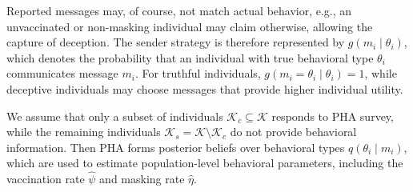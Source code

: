 \documentclass[sigconf,review]{acmart}
\begin{document}
Reported messages may, of course, not match actual behavior, e.g., an unvaccinated or non-masking individual may claim otherwise, allowing the
capture of deception. 
The sender strategy is therefore represented by $g(m_i\mid \theta_i)$, which denotes the probability that an individual with true behavioral type $\theta_i$ communicates message $m_i$.
For truthful individuals, $g(m_i=\theta_i\mid\theta_i)=1$, while deceptive individuals may choose messages that provide higher individual utility.

We assume that only a subset of individuals $\mathcal{K}_c\subseteq\mathcal{K}$ responds to PHA survey, while the remaining individuals $\mathcal{K}_s=\mathcal{K}\setminus\mathcal{K}_c$ do not provide behavioral information. Then PHA forms posterior beliefs over behavioral types $q(\theta_i\mid m_i)$, which are used to estimate population-level behavioral parameters, including the vaccination rate $\widehat{\psi}$ and masking rate $\widehat{\eta}$.
\end{document}
